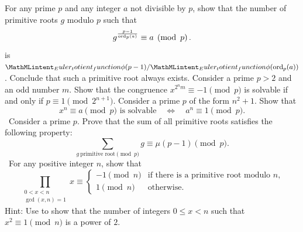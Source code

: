 \begin{challenge}
  \exercise \label{exercise:primitive-root-with-universal-exponent}For any prime $p$ and any integer $a$ not divisible by $p$, show that the number of primitive roots $g$ modulo $p$ such that
  \begin{equation*}
    g^{\frac{p-1}{\operatorname{ord}_p(a)}}\equiv a\mkern5mu\left(\operatorname{mod} \mkern 6mu p\right).
  \end{equation*}
  is $\totient(p-1)/\totient(\ord_p(a))$. Conclude that such a primitive root always exists.
  \exercise Consider a prime $p>2$ and an odd number $m$. Show that the congruence $x^{2^nm}\equiv -1\pmod{p}$ is solvable if and only if $p\equiv 1\pmod{2^{n+1}}$.
  \exercise Consider a prime $p$ of the form $n^2+1$. Show that
  \begin{equation*}
    x^n\equiv a\pmod{p}\text{ is solvable}\quad\Leftrightarrow\quad a^n\equiv 1\pmod{p}.
  \end{equation*}
  \exercise \cite[art. 81]{gauss1986}~Consider a prime $p$. Prove that the sum of all primitive roots satisfies the following property:
  \begin{equation*}
    \sum_{g~\text{primitive root}\pmod{p}}g \equiv \mu(p-1)\pmod{p}.
  \end{equation*}
  \exercise \cite[art.~78]{gauss1986}~For any positive integer $n$, show that
  \begin{equation*}
    \prod_{\substack{0<x<n\\ \gcd(x,n)=1}} x \equiv
    \begin{cases}
      -1\pmod{n} & \text{if there is a primitive root modulo $n$,}\\
      1\pmod{n} & \text{otherwise.}
    \end{cases}
  \end{equation*}
  Hint: Use  to show that the number of integers $0\leq x<n$ such that $x^2\equiv 1\pmod{n}$ is a power of $2$.
\end{challenge}

